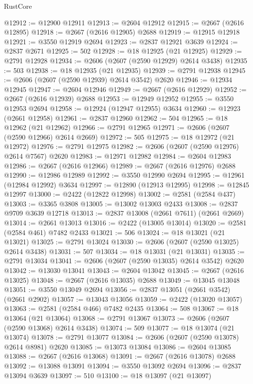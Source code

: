 \begin{lexlean}{RustCore}
\begin{coremodule}
@12912 := @12900 @12911
@12913 := @2604 @12912
@12915 := @2667 (@2616 @12895)
@12918 := @2667 (@2616 @12905) @2688
@12919 := @12915 @12918
@12921 := @3550 @12919 @2694
@12923 := @2837 @12921 @3639
@12924 := @2837 @2671
@12925 := 502
@12928 := @18 @12925 (@21 @12925)
@12929 := @2791 @12928
@12934 := @2606 (@2607 (@2590 @12929) @2614 @3438)
@12935 := 503
@12938 := @18 @12935 (@21 @12935)
@12939 := @2791 @12938
@12945 := @2606 (@2607 (@2590 @12939) @2614 @3542) @2620
@12946 := @12934 @12945
@12947 := @2604 @12946
@12949 := @2667 (@2616 @12929)
@12952 := @2667 (@2616 @12939) @2688
@12953 := @12949 @12952
@12955 := @3550 @12953 @2694
@12958 := @12924 (@12947 @12955) @3634
@12960 := @12923 (@2661 @12958)
@12961 := @2837 @12960
@12962 := 504
@12965 := @18 @12962 (@21 @12962)
@12966 := @2791 @12965
@12971 := @2606 (@2607 (@2590 @12966) @2614 @2669)
@12972 := 505
@12975 := @18 @12972 (@21 @12972)
@12976 := @2791 @12975
@12982 := @2606 (@2607 (@2590 @12976) @2614 @7567) @2620
@12983 := @12971 @12982
@12984 := @2604 @12983
@12986 := @2667 (@2616 @12966)
@12989 := @2667 (@2616 @12976) @2688
@12990 := @12986 @12989
@12992 := @3550 @12990 @2694
@12995 := @12961 (@12984 @12992) @3634
@12997 := @12890 (@12913 @12995)
@12998 := @12845 @12997
@13000 := @2422 (@12822 @12998)
@13002 := @2581 (@2584 @437)
@13003 := @3365 @3808
@13005 := @13002 @13003 @2433
@13008 := @2837 @9709 @3639 @12718
@13013 := @2837 @13008 (@2661 @7611) (@2661 @2669)
@13014 := @2661 @13013
@13016 := @2422 (@13005 @13014)
@13020 := @2581 (@2584 @461) @7482 @2433
@13021 := 506
@13024 := @18 @13021 (@21 @13021)
@13025 := @2791 @13024
@13030 := @2606 (@2607 (@2590 @13025) @2614 @3438)
@13031 := 507
@13034 := @18 @13031 (@21 @13031)
@13035 := @2791 @13034
@13041 := @2606 (@2607 (@2590 @13035) @2614 @3542) @2620
@13042 := @13030 @13041
@13043 := @2604 @13042
@13045 := @2667 (@2616 @13025)
@13048 := @2667 (@2616 @13035) @2688
@13049 := @13045 @13048
@13051 := @3550 @13049 @2694
@13056 := @2837 @13051 (@2661 @3542) (@2661 @2902)
@13057 := @13043 @13056
@13059 := @2422 (@13020 @13057)
@13063 := @2581 (@2584 @466) @7482 @2435
@13064 := 508
@13067 := @18 @13064 (@21 @13064)
@13068 := @2791 @13067
@13073 := @2606 (@2607 (@2590 @13068) @2614 @3438)
@13074 := 509
@13077 := @18 @13074 (@21 @13074)
@13078 := @2791 @13077
@13084 := @2606 (@2607 (@2590 @13078) @2614 @8981) @2620
@13085 := @13073 @13084
@13086 := @2604 @13085
@13088 := @2667 (@2616 @13068)
@13091 := @2667 (@2616 @13078) @2688
@13092 := @13088 @13091
@13094 := @3550 @13092 @2694
@13096 := @2837 @13094 @3639
@13097 := 510
@13100 := @18 @13097 (@21 @13097)

\end{coremodule}
\end{lexlean}
